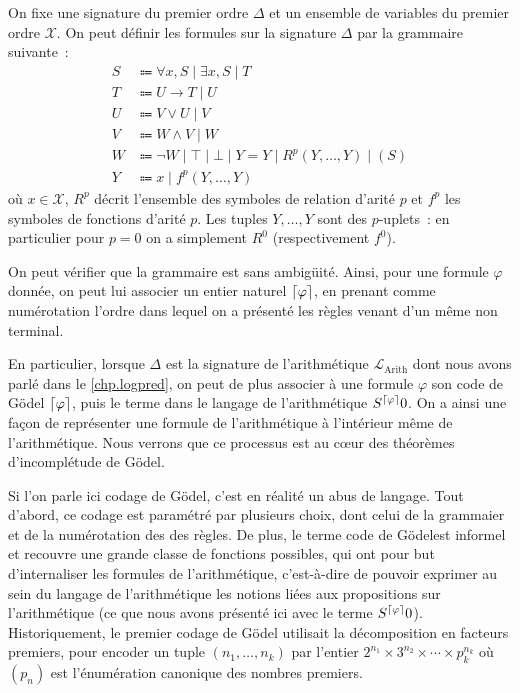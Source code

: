 \begin{example}
  On fixe une signature du premier ordre $\Delta$ et un ensemble de variables
  du premier ordre $\mathcal X$. On peut définir les formules sur la signature
  $\Delta$ par la grammaire suivante~:
  \begin{align*}
    S &\Coloneq \forall x, S \mid \exists x, S\mid T\\
    T &\Coloneq U \to T \mid U\\
    U &\Coloneq V \lor U \mid V\\
    V &\Coloneq W \land V \mid W\\
    W &\Coloneq \lnot W \mid \top \mid \bot \mid Y = Y \mid
    R^p(Y,\ldots,Y)\mid (S)\\
    Y &\Coloneq x \mid f^p(Y,\ldots,Y)
  \end{align*}
  où $x \in \mathcal X$, $R^p$ décrit l'ensemble des symboles de relation
  d'arité $p$ et $f^p$ les symboles de fonctions d'arité $p$. Les tuples
  $Y,\ldots,Y$ sont des $p$-uplets~: en particulier pour $p = 0$ on a simplement
  $R^0$ (respectivement $f^0$).
  
  On peut vérifier que la grammaire est sans ambigüité. Ainsi, pour une formule
  $\varphi$ donnée, on peut lui associer un entier naturel $\lceil\varphi\rceil$, en
  prenant comme numérotation l'ordre dans lequel on a présenté les règles venant
  d'un même non terminal.

  En particulier, lorsque $\Delta$ est la signature de l'arithmétique
  $\mathcal L_{\mathrm{Arith}}$ dont nous avons parlé dans le
  \cref{chp.logpred}, on peut de plus associer à une formule $\varphi$ son
  code de Gödel $\lceil\varphi\rceil$, puis le terme dans le langage de l'arithmétique
  $S^{\lceil\varphi\rceil}0$. On a ainsi une façon de représenter une formule de
  l'arithmétique à l'intérieur même de l'arithmétique. Nous verrons que ce
  processus est au c\oe ur des théorèmes d'incomplétude de Gödel.
\end{example}

\begin{remark}
  Si l'on parle ici  codage de Gödel, c'est en réalité un abus de
  langage. Tout d'abord, ce codage est paramétré par plusieurs choix, dont celui
  de la grammaier et de la numérotation des des règles. De plus, le terme
  \og code de Gödel\fg est informel et recouvre une grande classe de fonctions
  possibles, qui ont pour but d'internaliser les formules de l'arithmétique,
  c'est-à-dire de pouvoir exprimer au sein du langage de l'arithmétique les
  notions liées aux propositions sur l'arithmétique (ce que nous avons présenté
  ici avec le terme $S^{\lceil\varphi\rceil}0$). Historiquement, le premier codage de
  Gödel utilisait la décomposition en facteurs premiers, pour encoder un
  tuple $(n_1,\ldots,n_k)$ par l'entier
  $2^{n_1}\times 3^{n_2}\times\cdots \times p_k^{n_k}$ où $(p_n)$ est
  l'énumération canonique des nombres premiers.
\end{remark}

